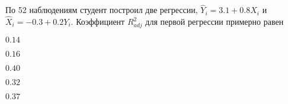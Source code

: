 
\begin{question}
По 52 наблюдениям студент построил две регрессии,
\(\hat Y_i = 3.1 + 0.8X_i\) и \(\hat X_i = -0.3 + 0.2Y_i\). Коэффициент
\(R^2_{adj}\) для первой регрессии примерно равен
\begin{answerlist}
  \item \(0.14\)
  \item \(0.16\)
  \item \(0.40\)
  \item \(0.32\)
  \item \(0.37\)
\end{answerlist}
\end{question}


